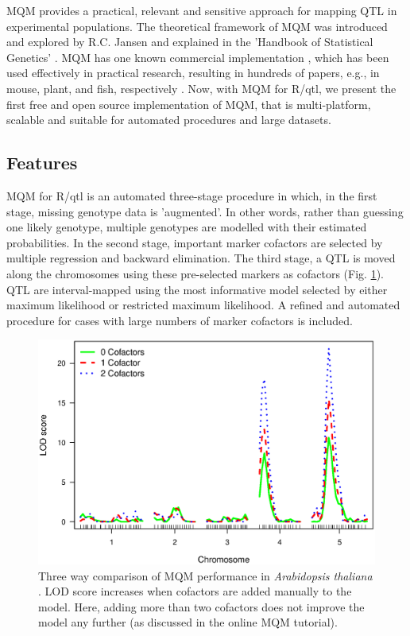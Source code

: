 MQM provides a practical, relevant and sensitive approach for mapping QTL in experimental 
populations. The theoretical framework of MQM was introduced and explored by R.C. Jansen 
\cite{Jansen:1994a} and explained in the 'Handbook of Statistical Genetics' 
\cite{Handbook:Jansen:2007}. MQM has one known commercial implementation \cite{Mapqtl:2002}, 
which has been used effectively in practical research, resulting in hundreds of papers, e.g., 
in mouse, plant, and fish, respectively \cite{DeMooij:2009, Jeuken:2009, Kitano:2009}. Now, 
with MQM for R/qtl, we present the first free and open source implementation of MQM, that is 
multi-platform, scalable and suitable for automated procedures and large datasets.

\subsection{Features}
MQM for R/qtl is an automated three-stage procedure in which, in the first stage, missing 
genotype data is 'augmented'.  In other words, rather than guessing one likely genotype, 
multiple genotypes are modelled with their estimated probabilities. In the second stage, 
important marker cofactors are selected by multiple regression and backward elimination. 
The third stage, a QTL is moved along the chromosomes using these pre-selected markers as 
cofactors (Fig. \ref{fig:comparison}). QTL are interval-mapped using the most informative 
model selected by either maximum likelihood or restricted maximum likelihood. A refined 
and automated procedure for cases with large numbers of marker cofactors is included. 

\begin{figure}[h!]
  \centering
  \includegraphics[keepaspectratio,scale=0.30]{eps/image_3_3.eps}
  \caption[Comparison of QTL mapping methodologies.]{ Three way comparison of MQM performance in {\it Arabidopsis 
          thaliana} \citep{Fu:2007}. LOD score increases when cofactors are added manually to the model. Here, 
          adding more than two cofactors does not improve the model any further (as discussed in the online 
          MQM tutorial).}
  \label{fig:comparison}
\end{figure}

